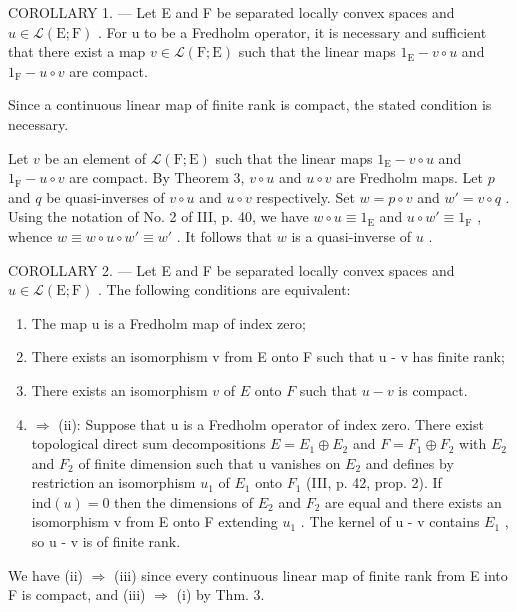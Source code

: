 COROLLARY 1. --- Let E and F be separated locally convex spaces and \(u \in \mathcal{L}(\mathrm{E};\mathrm{F})\) . For u to be a Fredholm operator, it is necessary and sufficient that there exist a map \(v \in \mathcal{L}(\mathrm{F};\mathrm{E})\) such that the linear maps \(1_{\mathrm{E}} - v \circ u\) and \(1_{\mathrm{F}} - u \circ v\) are compact.

Since a continuous linear map of finite rank is compact, the stated condition is necessary.

Let \(v\) be an element of \(\mathcal{L}(\mathrm{F};\mathrm{E})\) such that the linear maps \(1_{\mathrm{E}} - v \circ u\) and \(1_{\mathrm{F}} - u \circ v\) are compact. By Theorem 3, \(v \circ u\) and \(u \circ v\) are Fredholm maps. Let \(p\) and \(q\) be quasi-inverses of \(v \circ u\) and \(u \circ v\) respectively. Set \(w = p \circ v\) and \(w' = v \circ q\) . Using the notation of No. 2 of III, p. 40, we have \(w \circ u \equiv 1_{\mathrm{E}}\) and \(u \circ w' \equiv 1_{\mathrm{F}}\) , whence \(w \equiv w \circ u \circ w' \equiv w'\) . It follows that \(w\) is a quasi-inverse of \(u\) .

COROLLARY 2. --- Let E and F be separated locally convex spaces and \(u \in \mathcal{L}(\mathrm{E};\mathrm{F})\) . The following conditions are equivalent:

\begin{enumerate}
\def\labelenumi{(\roman{enumi})}
\item
  The map u is a Fredholm map of index zero;
\item
  There exists an isomorphism v from E onto F such that u - v has finite rank;
\item
  There exists an isomorphism \(v\) of \(E\) onto \(F\) such that \(u - v\) is compact.
\item
  \(\Longrightarrow\) (ii): Suppose that u is a Fredholm operator of index zero. There exist topological direct sum decompositions \(E = E_{1} \oplus E_{2}\) and \(F = F_{1} \oplus F_{2}\) with \(E_{2}\) and \(F_{2}\) of finite dimension such that u vanishes on \(E_{2}\) and defines by restriction an isomorphism \(u_{1}\) of \(E_{1}\) onto \(F_{1}\) (III, p. 42, prop. 2). If \(\text{ind}(u) = 0\) then the dimensions of \(E_{2}\) and \(F_{2}\) are equal and there exists an isomorphism v from E onto F extending \(u_{1}\) . The kernel of u - v contains \(E_{1}\) , so u - v is of finite rank.
\end{enumerate}

We have (ii) \(\Longrightarrow\) (iii) since every continuous linear map of finite rank from E into F is compact, and (iii) \(\Longrightarrow\) (i) by Thm. 3.

